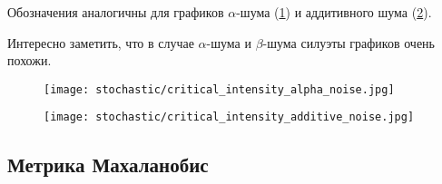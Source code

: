        Обозначения аналогичны для графиков \(\alpha\)-шума (\ref{critical_intensity_alpha_noise}) и аддитивного шума (\ref{critical_intensity_additive_noise}).

        Интересно заметить, что в случае \(\alpha\)-шума и \(\beta\)-шума силуэты графиков очень похожи.

        \begin{figure}
            \centering
            \texttt{[image: stochastic/critical\_intensity\_alpha\_noise.jpg]}
        
            \captionsetup{justification=centering}
            \caption{}
            \label{critical_intensity_alpha_noise}
        \end{figure}

        \begin{figure}
            \centering
            \texttt{[image: stochastic/critical\_intensity\_additive\_noise.jpg]}
        
            \captionsetup{justification=centering}
            \caption{}
            \label{critical_intensity_additive_noise}
        \end{figure}


    \subsection{Метрика Махаланобис}
        
